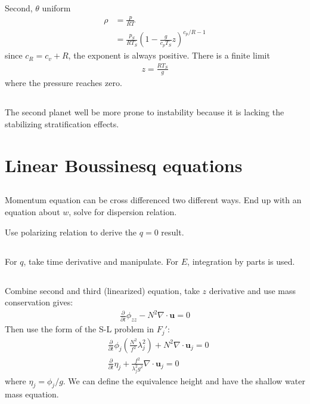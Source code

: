 \documentclass[11pt,letterpaper]{book}
\theoremstyle{definition}
\newcommand{\pe}{\partial}
\newcommand{\ve}[1]{\boldsymbol{#1}}
\begin{document}
Second, $\theta$ uniform
\begin{align*}
    \rho &= \frac{p}{RT}\\
    &= \frac{p_S}{R T_S} \left(1-\frac{g }{c_p T_S}z\right)^{c_p/R-1}
\end{align*}
since $c_R = c_v+R$, the exponent is always positive. There is a finite limit 
\begin{align*}
    z = \frac{RT_S}{g}
\end{align*}
where the pressure reaches zero.

\subsection{}
The second planet well be more prone to instability because it is lacking the stabilizing stratification effects.


\section{Linear Boussinesq equations}
\subsection{}
Momentum equation can be cross differenced two different ways. End up with an equation about $w$, solve for dispersion relation.

Use polarizing relation to derive the $q=0$ result.

\subsection{}
For $q$, take time derivative and manipulate. For $E$, integration by parts is used.

\subsection{}
Combine second and third (linearized) equation, take $z$ derivative and use mass conservation gives:
\begin{align*}
    \frac{\pe}{\pe t}\phi_{zz}-N^2\nabla\cdot \ve u = 0
\end{align*}
Then use the form of the S-L problem in $F_j'$:
\begin{align*}
    &\frac{\pe}{\pe t}\phi_j \left(\frac{N^2}{f^2}\lambda_j^2\right)+N^2\nabla\cdot \ve u_j = 0\\
    &\frac{\pe}{\pe t}\eta_j +\frac{f^2}{\lambda_j^2 g^2}\nabla\cdot \ve u_j = 0
\end{align*}
where $\eta_j = \phi_j/g$. We can define the equivalence height and have the shallow water mass equation.
\end{document}
